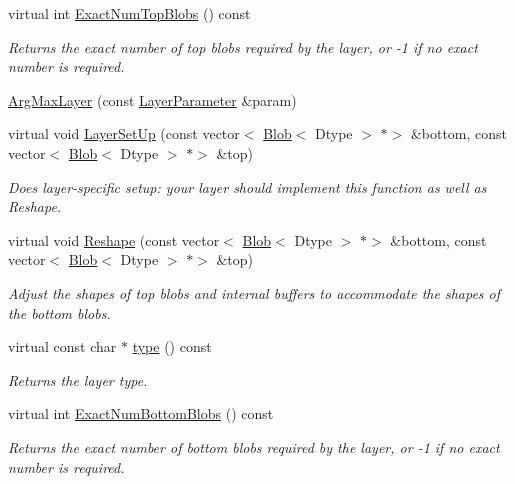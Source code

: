 \begin{DoxyCompactItemize}
virtual int \mbox{\hyperlink{classcaffe_1_1_arg_max_layer_a45e9c6e7b572b915be8731fcb6403695}{Exact\+Num\+Top\+Blobs}} () const
\begin{DoxyCompactList}\small\item\em Returns the exact number of top blobs required by the layer, or -\/1 if no exact number is required. \end{DoxyCompactList}\item 
\mbox{\hyperlink{classcaffe_1_1_arg_max_layer_a77429601f3d7f27b48720a1b703491be}{Arg\+Max\+Layer}} (const \mbox{\hyperlink{classcaffe_1_1_layer_parameter}{Layer\+Parameter}} \&param)
\item 
virtual void \mbox{\hyperlink{classcaffe_1_1_arg_max_layer_a1251d1d407e8d15a83ba6807d013b97d}{Layer\+Set\+Up}} (const vector$<$ \mbox{\hyperlink{classcaffe_1_1_blob}{Blob}}$<$ Dtype $>$ $\ast$$>$ \&bottom, const vector$<$ \mbox{\hyperlink{classcaffe_1_1_blob}{Blob}}$<$ Dtype $>$ $\ast$$>$ \&top)
\begin{DoxyCompactList}\small\item\em Does layer-\/specific setup\+: your layer should implement this function as well as Reshape. \end{DoxyCompactList}\item 
virtual void \mbox{\hyperlink{classcaffe_1_1_arg_max_layer_a658393ef566ec585bf540a1b6f31a929}{Reshape}} (const vector$<$ \mbox{\hyperlink{classcaffe_1_1_blob}{Blob}}$<$ Dtype $>$ $\ast$$>$ \&bottom, const vector$<$ \mbox{\hyperlink{classcaffe_1_1_blob}{Blob}}$<$ Dtype $>$ $\ast$$>$ \&top)
\begin{DoxyCompactList}\small\item\em Adjust the shapes of top blobs and internal buffers to accommodate the shapes of the bottom blobs. \end{DoxyCompactList}\item 
\mbox{\label{classcaffe_1_1_arg_max_layer_af4826eb75118ddf465b7c2ab99b10b45}} 
virtual const char $\ast$ \mbox{\hyperlink{classcaffe_1_1_arg_max_layer_af4826eb75118ddf465b7c2ab99b10b45}{type}} () const
\begin{DoxyCompactList}\small\item\em Returns the layer type. \end{DoxyCompactList}\item 
virtual int \mbox{\hyperlink{classcaffe_1_1_arg_max_layer_a786fb4163cd0a31a564100ce7e4b74b2}{Exact\+Num\+Bottom\+Blobs}} () const
\begin{DoxyCompactList}\small\item\em Returns the exact number of bottom blobs required by the layer, or -\/1 if no exact number is required. \end{DoxyCompactList}\item 

\end{DoxyCompactItemize}
